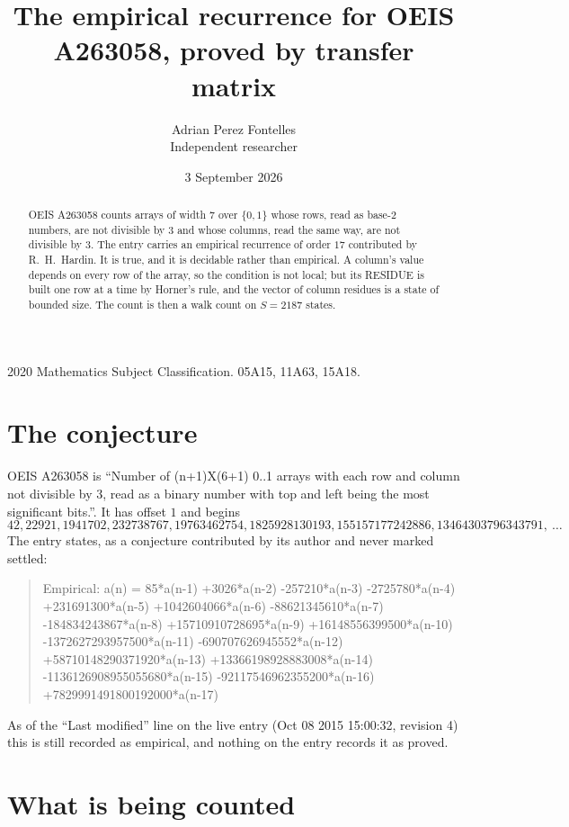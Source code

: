\documentclass[11pt,a4paper]{article}
\title{The empirical recurrence for OEIS A263058, proved by transfer matrix}
\author{Adrian Perez Fontelles\\ \small Independent researcher}
\date{3 September 2026}
\theoremstyle{plain}
\theoremstyle{definition}
\begin{document}
\maketitle

\begin{abstract}
OEIS A263058 counts arrays of width $7$ over $\{0,1\}$ whose rows, read as base-$2$
numbers, are not divisible by $3$ and whose columns, read the same way, are not divisible by
$3$. The entry carries an empirical recurrence of order $17$ contributed by
R.~H.~Hardin. It is true, and it is decidable rather than empirical. A column's value depends on
every row of the array, so the condition is not local; but its RESIDUE is built one row at a
time by Horner's rule, and the vector of column residues is a state of bounded size. The count
is then a walk count on $S=2187$ states.
\end{abstract}

\noindent\small 2020 Mathematics Subject Classification. 05A15, 11A63, 15A18.\normalsize

\section{The conjecture}

OEIS A263058 is ``Number of (n+1)X(6+1) 0..1 arrays with each row and column not divisible by 3, read as a binary number with top and left being the most significant bits.''. It has offset $1$ and begins
\[
42, 22921, 1941702, 232738767, 19763462754, 1825928130193, 155157177242886, 13464303796343791,\ \dots
\]
The entry states, as a conjecture contributed by its author and never marked settled:
\begin{quote}
Empirical: a(n) = 85*a(n-1) +3026*a(n-2) -257210*a(n-3) -2725780*a(n-4) +231691300*a(n-5) +1042604066*a(n-6) -88621345610*a(n-7) -184834243867*a(n-8) +15710910728695*a(n-9) +16148556399500*a(n-10) -1372627293957500*a(n-11) -690707626945552*a(n-12) +58710148290371920*a(n-13) +13366198928883008*a(n-14) -1136126908955055680*a(n-15) -92117546962355200*a(n-16) +7829991491800192000*a(n-17)
\end{quote}
As of the ``Last modified'' line on the live entry (Oct 08 2015 15:00:32, revision 4) this is still
recorded as empirical, and nothing on the entry records it as proved.

\section{What is being counted}
\end{document}
